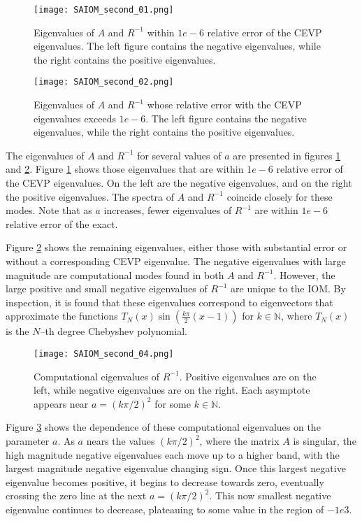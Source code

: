 \documentclass{sfuthesis}
\begin{document}
\begin{figure}
\texttt{[image: SAIOM\_second\_01.png]}
\caption{Eigenvalues of $A$ and $R^{-1}$ within $1e-6$ relative error of the CEVP eigenvalues. The left figure contains the negative eigenvalues, while the right contains the positive eigenvalues.}
\label{fig:SAIOM_2 1}
\end{figure}

\begin{figure}
\texttt{[image: SAIOM\_second\_02.png]}
\caption{Eigenvalues of $A$ and $R^{-1}$ whose relative error with the CEVP eigenvalues exceeds $1e-6$. The left figure contains the negative eigenvalues, while the right contains the positive eigenvalues.}
\label{fig:SAIOM_2 2}
\end{figure}

The eigenvalues of $A$ and $R^{-1}$ for several values of $a$ are presented in figures \ref{fig:SAIOM_2 1} and \ref{fig:SAIOM_2 2}.
Figure \ref{fig:SAIOM_2 1} shows those eigenvalues that are within $1e-6$ relative error of the CEVP eigenvalues.
On the left are the negative eigenvalues, and on the right the positive eigenvalues.
The spectra of $A$ and $R^{-1}$ coincide closely for these modes.
Note that as $a$ increases, fewer eigenvalues of $R^{-1}$ are within $1e-6$ relative error of the exact.

Figure \ref{fig:SAIOM_2 2} shows the remaining eigenvalues, either those with substantial error or without a corresponding CEVP eigenvalue.
The negative eigenvalues with large magnitude are computational modes found in both $A$ and $R^{-1}$.
However, the large positive and small negative eigenvalues of $R^{-1}$ are unique to the IOM.
By inspection, it is found that these eigenvalues correspond to eigenvectors that approximate the functions $T_N(x) \sin \left ( \frac{k \pi}{2} (x-1) \right )$
for $k \in \mathbb{N}$, where $T_N(x)$ is the $N$--th degree Chebyshev polynomial.

\begin{figure}
\texttt{[image: SAIOM\_second\_04.png]}
\caption{Computational eigenvalues of $R^{-1}$. Positive eigenvalues are on the left, while negative eigenvalues are on the right. Each asymptote appears near $a = (k \pi /2)^2$ for some $k \in \mathbb{N}$.}
\label{fig:SAIOM_2 3}
\end{figure}

Figure \ref{fig:SAIOM_2 3} shows the dependence of these computational eigenvalues on the parameter $a$.
As $a$ nears the values $(k \pi /2)^2$, where the matrix $A$ is singular, the high magnitude negative eigenvalues each move up to a higher band, with the largest magnitude negative eigenvalue changing sign.
Once this largest negative eigenvalue becomes positive, it begins to decrease towards zero, eventually crossing the zero line at the next $a = (k \pi /2)^2$.
This now smallest negative eigenvalue continues to decrease, plateauing to some value in the region of $-1e3$.
\end{document}
